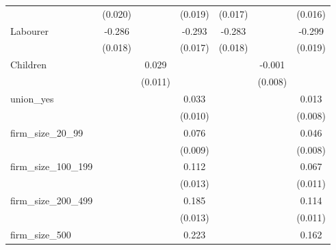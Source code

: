 {\begin{tabular}{l*{6}{c}}
                    &     (0.020)         &                     &     (0.019)         &     (0.017)         &                     &     (0.016)         \\
Labourer            &      -0.286\sym{***}&                     &      -0.293\sym{***}&      -0.283\sym{***}&                     &      -0.299\sym{***}\\
                    &     (0.018)         &                     &     (0.017)         &     (0.018)         &                     &     (0.019)         \\
Children            &                     &       0.029\sym{***}&                     &                     &      -0.001         &                     \\
                    &                     &     (0.011)         &                     &                     &     (0.008)         &                     \\
union\_yes           &                     &                     &       0.033\sym{***}&                     &                     &       0.013         \\
                    &                     &                     &     (0.010)         &                     &                     &     (0.008)         \\
firm\_size\_20\_99     &                     &                     &       0.076\sym{***}&                     &                     &       0.046\sym{***}\\
                    &                     &                     &     (0.009)         &                     &                     &     (0.008)         \\
firm\_size\_100\_199   &                     &                     &       0.112\sym{***}&                     &                     &       0.067\sym{***}\\
                    &                     &                     &     (0.013)         &                     &                     &     (0.011)         \\
firm\_size\_200\_499   &                     &                     &       0.185\sym{***}&                     &                     &       0.114\sym{***}\\
                    &                     &                     &     (0.013)         &                     &                     &     (0.011)         \\
firm\_size\_500       &                     &                     &       0.223\sym{***}&                     &                     &       0.162\sym{***}\\

\end{tabular}}
